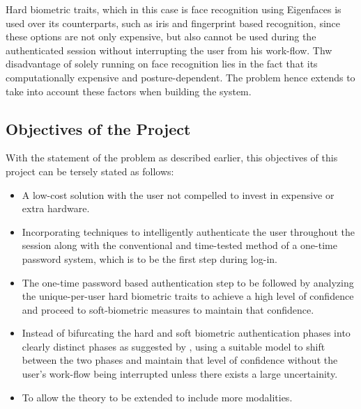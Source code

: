 \documentclass[12pt]{article}			%
\begin{document}
Hard biometric traits, which in this case is face recognition using Eigenfaces\cite{Turk91} is used over its counterparts, such as iris and fingerprint based recognition, since these options are not only expensive, but also cannot be used during the authenticated session without interrupting the user from his work-flow. 
Thw disadvantage of solely running on face recognition lies in the fact that its computationally expensive and posture-dependent. The problem hence extends to take into account these factors when building the system.

\subsection{ Objectives of the Project }
With the statement of the problem as described earlier, this objectives of this project can be tersely stated as follows:
\begin{itemize}
\item A low-cost solution with the user not compelled to invest in expensive or extra hardware.
\item Incorporating techniques to intelligently authenticate the user throughout the session along with the conventional and time-tested method of a one-time password system, which is to be the first step during log-in.
\item The one-time password based authentication step to be followed by analyzing the unique-per-user hard biometric traits to achieve a high level of confidence and proceed to soft-biometric measures to maintain that confidence.
\item Instead of bifurcating the hard and soft biometric authentication phases into clearly distinct phases as suggested by \cite{Niin10}, using a suitable model to shift between the two phases and maintain that level of confidence without the user's work-flow being interrupted unless there exists a large uncertainity.
\item To allow the theory to be extended to include more modalities.
\end{itemize}
\end{document}
